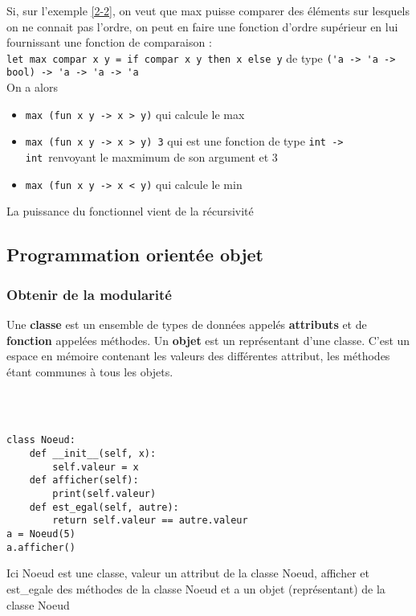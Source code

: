 \begin{example}
	Si, sur l'exemple \ref{2-2}, on veut que max puisse comparer des éléments sur lesquels on ne connait pas l'ordre, on peut en faire une fonction d'ordre supérieur en lui fournissant une fonction de comparaison : \\
	\lstinline|let max compar x y = if compar x y then x else y| de type \lstinline|('a -> 'a -> bool) -> 'a -> 'a -> 'a|\\
	On a alors \begin{itemize}[label =]
		\item \lstinline|max (fun x y -> x > y)| qui calcule le max 
		\item \lstinline|max (fun x y -> x > y) 3| qui est une fonction de type \lstinline|int -> int| renvoyant le maxmimum de son argument et 3
		\item \lstinline|max (fun x y -> x < y)| qui calcule le min
	\end{itemize}
\end{example}

\begin{rem}
	La puissance du fonctionnel vient de la récursivité
\end{rem}

\subsection{Programmation orientée objet}

\subsubsection{Obtenir de la modularité}

\begin{definition}
	Une \textbf{classe} est un ensemble de types de données appelés \textbf{attributs} et de \textbf{fonction} appelées méthodes. \newline
	Un \textbf{objet} est un représentant d'une classe. C'est un espace en mémoire contenant les valeurs des différentes attribut, les méthodes étant communes à tous les objets.
\end{definition}

\begin{example} \label{2-3}\enspace \\ \\
	\begin{minipage}{0.60 \linewidth}
		\begin{lstlisting}
class Noeud:
    def __init__(self, x):
        self.valeur = x
    def afficher(self):
        print(self.valeur)
    def est_egal(self, autre):
        return self.valeur == autre.valeur
a = Noeud(5)
a.afficher()
		\end{lstlisting}
	\end{minipage}\quad \begin{minipage}{0.35\linewidth}
		Ici Noeud est une classe, valeur un attribut de la classe Noeud, afficher et est\_egale des méthodes de la classe Noeud et a un objet (représentant) de la classe Noeud
	\end{minipage}
\end{example}

